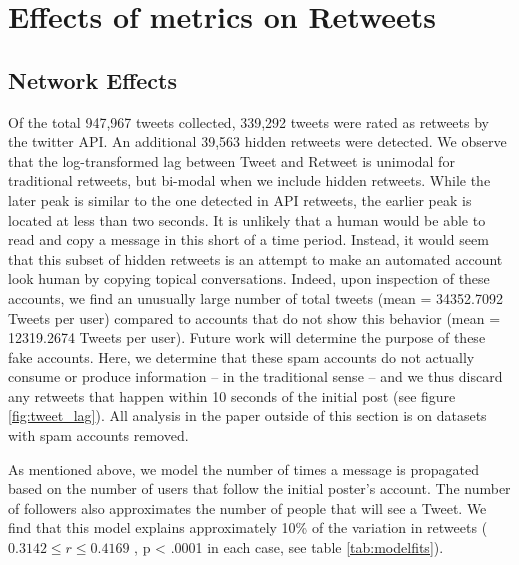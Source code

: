 \section{Effects of metrics on Retweets}
\label{sec:retweetfeatures}
\subsection{Network Effects}
Of the total 947,967 tweets collected, 339,292 tweets were rated as retweets by the twitter API. An additional {39,563} hidden retweets were detected. We observe that the log-transformed lag between Tweet and Retweet is unimodal for traditional retweets, but bi-modal when we include hidden retweets. While the later peak is similar to the one detected in API retweets, the earlier peak is located at less than two seconds. It is unlikely that a human would be able to read and copy a message in this short of a time period. Instead, it would seem that this subset of hidden retweets is an attempt to make an automated account look human by copying topical conversations. Indeed, upon inspection of these accounts, we find an unusually large number of total tweets (mean = 34352.7092 Tweets per user) compared to accounts that do not show this behavior (mean = 12319.2674 Tweets per user). Future work will determine the purpose of these fake accounts. Here, we determine that these spam accounts do not actually consume or produce information -- in the traditional sense -- and we thus discard any retweets that happen within 10 seconds of the initial post (see figure \ref{fig:tweet_lag}). All analysis in the paper outside of this section is on datasets with spam accounts removed. %

As mentioned above, we model the number of times a message is propagated based on the number of users that follow the initial poster's account. The number of followers also approximates the number of people that will see a Tweet. We find that this model explains approximately 10\% of the variation in retweets (\(0.3142 \leq r  \leq 0.4169\) , p < .0001 in each case, see table \ref{tab:modelfits}). 

